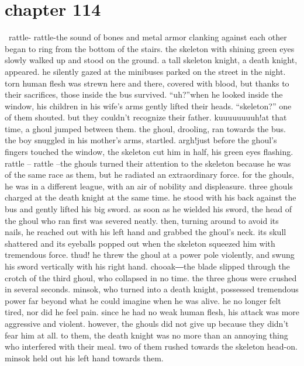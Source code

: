 \section{chapter 114}






 rattle- rattle-the sound of bones and metal armor clanking against each other began to ring from the bottom of the stairs.
 the skeleton with shining green eyes slowly walked up and stood on the ground.
a tall skeleton knight, a death knight, appeared.
he silently gazed at the minibuses parked on the street in the night.
 torn human flesh was strewn here and there, covered with blood, but thanks to their sacrifices, those inside the bus survived.
“uh?”when he looked inside the window, his children in his wife’s arms gently lifted their heads.
“skeleton?” one of them shouted.
but they couldn’t recognize their father.
kuuuuuuuuh!at that time, a ghoul jumped between them.
 the ghoul, drooling, ran towards the bus.
 the boy snuggled in his mother’s arms, startled.
argh!just before the ghoul’s fingers touched the window, the skeleton cut him in half, his green eyes flashing.
rattle – rattle –the ghouls turned their attention to the skeleton because he was of the same race as them, but he radiated an extraordinary force.
 for the ghouls, he was in a different league, with an air of nobility and displeasure.
three ghouls charged at the death knight at the same time.
 he stood with his back against the bus and gently lifted his big sword.
as soon as he wielded his sword, the head of the ghoul who ran first was severed neatly.
then, turning around to avoid its nails, he reached out with his left hand and grabbed the ghoul’s neck.
its skull shattered and its eyeballs popped out when the skeleton squeezed him with tremendous force.
thud!
he threw the ghoul at a power pole violently, and swung his sword vertically with his right hand.
chooak―the blade slipped through the crotch of the third ghoul, who collapsed in no time.
the three ghous were crushed in several seconds.
minsok, who turned into a death knight, possessed tremendous power far beyond what he could imagine when he was alive.
 he no longer felt tired, nor did he feel pain.
 since he had no weak human flesh, his attack was more aggressive and violent.
however, the ghouls did not give up because they didn’t fear him at all.
 to them, the death knight was no more than an annoying thing who interfered with their meal.
 two of them rushed towards the skeleton head-on.
minsok held out his left hand towards them.
